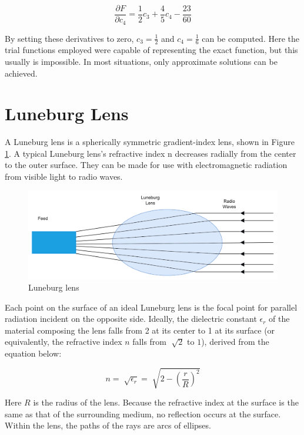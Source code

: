 \documentclass[a4paper,12pt]{report}
\begin{document}
\begin{equation}
  \frac{\partial F}{\partial c_4} = \frac{1}{2}c_3 + \frac{4}{5} c_4 - \frac{23}{60}
\end{equation}

By setting these derivatives to zero,
$c_3 = \frac{1}{2}$ and $c_4 = \frac{1}{6}$ can be computed.
Here the trial functions employed were capable of representing
the exact function, but this usually is impossible.
In most situations, only approximate solutions can be achieved.

\section{Luneburg Lens}


A Luneburg lens is a spherically symmetric gradient-index lens,
shown in Figure \ref{fig:luneburg_lens}.
A typical Luneburg lens's refractive index n decreases radially
from the center to the outer surface.
They can be made for use with electromagnetic radiation
from visible light to radio waves.

\begin{figure}
  \begin{center}
    \includegraphics[clip, keepaspectratio, width=0.5\linewidth]{img/luneburg_lens.png}
    \caption{Luneburg lens}
    \label{fig:luneburg_lens}
  \end{center}
\end{figure}

Each point on the surface of an ideal Luneburg lens is the
focal point for parallel radiation incident on the opposite side.
Ideally, the dielectric constant $\epsilon_r$ of the material
composing the lens falls from 2 at its center to 1 at its surface
(or equivalently, the refractive index $n$ falls from $\sqrt[]{2}$ to $1$),
derived from the equation below:

\begin{equation}
  n = \sqrt[]{\epsilon_r} = \sqrt[]{2 - \left(\frac{r}{R}\right)^2}
\end{equation}

Here $R$ is the radius of the lens.
Because the refractive index at the surface is the same
as that of the surrounding medium,
no reflection occurs at the surface.
Within the lens, the paths of the rays are arcs of ellipses.
\end{document}
